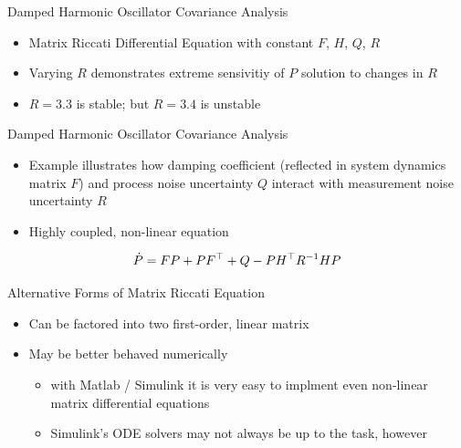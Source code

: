 \begin{frame}
\begin{center}
\end{center}
\end{frame}

\begin{frame}
\begin{center}
\end{center}
\end{frame}

\begin{frame}
\begin{center}
\end{center}
\end{frame}

\begin{frame}
Damped Harmonic Oscillator Covariance Analysis
\begin{itemize}
  \item Matrix Riccati Differential Equation with constant $F$, $H$, $Q$, $R$
  \item Varying $R$ demonstrates extreme sensivitiy of $P$ solution to changes in $R$
  \item $R=3.3$ is stable; but $R=3.4$ is unstable
\end{itemize} 
\end{frame}

\begin{frame}
Damped Harmonic Oscillator Covariance Analysis
\begin{itemize}
  \item Example illustrates how damping coefficient (reflected in system dynamics matrix $F$) and process noise uncertainty $Q$ interact with measurement noise uncertainty $R$
  \item Highly coupled, non-linear equation
\end{itemize}
\[\dot{P}=FP+PF^\top+Q - PH^\top R^{-1}HP\] 
\end{frame}

\begin{frame}
Alternative Forms of Matrix Riccati Equation
\begin{itemize}
  \item Can be factored into two first-order, linear matrix
  \item May be better behaved numerically
	\begin{itemize}
		\item with Matlab / Simulink it is very easy to implment even non-linear matrix differential equations
		\item Simulink's ODE solvers may not always be up to the task, however
	\end{itemize}
\end{itemize} 
\end{frame}


